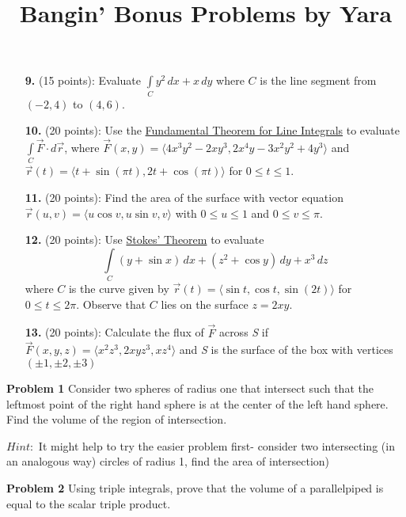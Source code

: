 \documentclass[a4paper, 12pt]{article} %
\numberwithin{equation}{section}
\begin{document}
\begin{enumerate}
\item[\textbf{9.}] (15 points): Evaluate $\int\limits_{C}y^2\, dx + x\, dy$ \hspace{1mm} where $C$ is the line segment from $(-2,4)$ to $(4,6)$.
\vspace{95mm}
\item[\textbf{10.}] (20 points): Use the \underline{Fundamental Theorem for Line Integrals} to evaluate $\int\limits_{C}\vec{F}\cdot d\vec{r}$, \hspace{1mm} where $\vec{F}(x,y)=\langle 4x^3y^2-2xy^3, 2x^4y-3x^2y^2+4y^3\rangle$ \hspace{1mm} and
$\vec{r}(t)=\langle t+\sin(\pi t), 2t+\cos(\pi t)\rangle$ \hspace{1mm} for $0\leq t \leq 1$.
\vspace{200mm}
\item[\textbf{11.}] (20 points): Find the area of the surface with vector equation $\vec{r}(u,v)=\langle u\cos v, u\sin v, v\rangle$ with $0 \leq u \leq 1$ and $0 \leq v \leq \pi$.
\vspace{200mm}
\item[\textbf{12.}] (20 points): Use \underline{Stokes' Theorem} to evaluate $$\int\limits_{C}(y+\sin x)\, dx +(z^2+\cos y)\, dy + x^3\, dz$$ where $C$ is the curve given by $\vec{r}(t)=\langle \sin t, \cos t, \sin(2t)\rangle$ for $0 \leq t \leq 2\pi$.  Observe that $C$ lies on the surface $z=2xy$.
\vspace{200mm}
\item[\textbf{13.}] (20 points): Calculate the flux of $\vec{F}$ across \textit{S} if $\vec{F}(x,y, z)=\langle x^2z^3, 2xyz^3, xz^4\rangle$ and \textit{S} is the surface of the box with vertices $(\pm 1, \pm 2, \pm 3)$
\vspace{220mm}
\end{enumerate}


\title{Bangin' Bonus Problems by Yara}

\textbf{Problem 1} Consider two spheres of radius one that intersect such that the leftmost point of the right hand sphere is at the center of the left hand sphere. Find the volume of the region of intersection.

$Hint:$ It might help to try the easier problem first- consider two intersecting (in an analogous way) circles of radius 1, find the area of intersection)

\vspace{110mm}

\textbf{Problem 2} Using triple integrals, prove that the volume of a parallelpiped is equal to the scalar triple product.
\end{document}
